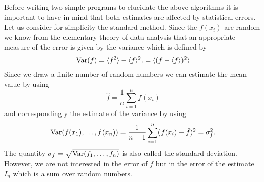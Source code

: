 Before writing two simple programs to elucidate the above algorithms
it is important to have in mind that both estimates are affected by
statistical errors. Let us consider for simplicity 
the standard method. Since the $f(x_i)$ are random we know 
from the elementary theory of data analysis
that an appropriate measure of the error is given by the variance
which is defined by
\begin{equation}
{\rm Var}(f) = \langle f^2 \rangle - \langle f \rangle^2.
= \langle (f -\langle f \rangle)^2 \rangle
\end{equation}
Since we draw a finite number of random numbers we can
estimate the mean value by using
\begin{equation}
\hat{f}  = \frac{1}{n} \sum_{i=1}^n f(x_i) 
\end{equation}
and correspondingly the estimate of the variance by using
\begin{equation}
{\rm Var}(f(x_1),\ldots, f(x_n)) = \frac{1}{n-1} \sum_{i=1}^n 
   (f(x_i)- \hat{f})^2 = \sigma_f^2.
\end{equation}
The quantity $\sigma_f = \sqrt{{\rm Var}(f_1, \ldots, f_n)}$ 
is also called the standard deviation. However,
we are not interested in the error of $f$ but in the error of the
estimate $I_n$ which is a sum over random numbers. 

